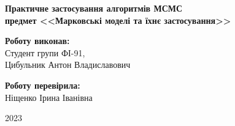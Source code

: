 \begin{titlepage}
    \begin{center}
        \begin{spacing}{1.5}
            \textbf{\Large{Практичне застосування алгоритмів МСМС}} \\ 
            \vspace{1cm}\textbf{\normalsize{предмет <<Марковські моделі та їхнє застосування>>}}
        \end{spacing}
    \end{center}
    
    \vspace{\fill}
    
    \newlength{\maxname}

    \hfill\parbox{\maxname}{
        \begin{spacing}{1.1}
            \small{\textbf{Роботу виконав:}} \\ 
            \small{Студент групи ФІ-91,} \\
            \small{Цибульник Антон Владиславович} \\
        \end{spacing}
    }

    \hfill\parbox{\maxname}{
        \begin{spacing}{1.1}
            \small{\textbf{Роботу перевірила:}} \\ 
            \small{Ніщенко Ірина Іванівна} \\
        \end{spacing}
    }

    \vspace{0.5cm}

    \begin{center}
        \small{2023}
    \end{center}
    
\end{titlepage}